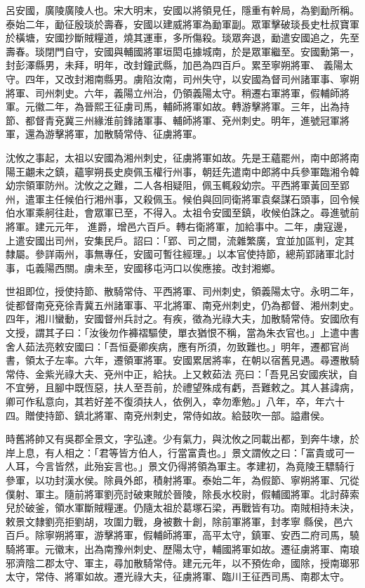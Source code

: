 
\begin{pinyinscope}

 呂安國，廣陵廣陵人也。宋大明末，安國以將領見任，隱重有幹局，為劉勔所稱。泰始二年，勔征殷琰於壽春，安國以建威將軍為勔軍副。眾軍擊破琰長史杜叔寶軍於橫塘，安國抄斷賊糧道，燒其運車，多所傷殺。琰眾奔退，勔遣安國追之，先至壽春。琰閉門自守，安國與輔國將軍垣閎屯據城南，於是眾軍繼至。安國勳第一，封彭澤縣男，未拜，明年，改封鐘武縣，加邑為四百戶。累至寧朔將軍、
 義陽太守。四年，又改封湘南縣男。虜陷汝南，司州失守，以安國為督司州諸軍事、寧朔將軍、司州刺史。六年，義陽立州治，仍領義陽太守。稍遷右軍將軍，假輔師將軍。元徽二年，為晉熙王征虜司馬，輔師將軍如故。轉游擊將軍。三年，出為持節、都督青兗冀三州緣淮前鋒諸軍事、輔師將軍、兗州刺史。明年，進號冠軍將軍，還為游擊將軍，加散騎常侍、征虜將軍。



 沈攸之事起，太祖以安國為湘州刺史，征虜將軍如故。先是王蘊罷州，南中郎將南陽王翽未之鎮，蘊寧朔長史庾佩玉權行州事，朝廷先遣南中郎將中兵參軍臨湘令韓幼宗領軍防州。沈攸之之難，二人各相疑阻，佩玉輒殺幼宗。平西將軍黃回至郢州，遣軍主任候伯行湘州事，又殺佩玉。候伯與回同衛將軍袁粲謀石頭事，回令候伯水軍乘舸往赴，會眾軍已至，不得入。太祖令安國至鎮，收候伯誅之。尋進號前將軍。建元元年，
 進爵，增邑六百戶。轉右衛將軍，加給事中。二年，虜寇邊，上遣安國出司州，安集民戶。詔曰：「郢、司之間，流雜繁廣，宜並加區判，定其隸屬。參詳兩州，事無專任，安國可暫往經理。」以本官使持節，總荊郢諸軍北討事，屯義陽西關。虜未至，安國移屯沔口以俟應接。改封湘鄉。



 世祖即位，授使持節、散騎常侍、平西將軍、司州刺史，領義陽太守。永明二年，徙都督南兗兗徐青冀五州諸軍事、平北將軍、南兗州刺史，仍為都督、湘州刺史。四年，湘川蠻動，安國督州兵討之。有疾，徵為光祿大夫，加散騎常侍。安國欣有文授，謂其子曰：「汝後勿作褲褶驅使，單衣猶恨不稱，當為朱衣官也。」上遣中書舍人茹法亮敕安國曰：「吾恒憂卿疾病，應有所須，勿致難也。」明年，遷都官尚書，領太子左率。六年，遷領軍將軍。安國累居將率，在朝以宿舊見遇。尋遷散騎常侍、金紫光祿大夫、兗州中正，給扶。上又敕茹法
 亮曰：「吾見呂安國疾狀，自不宜勞，且腳中既恆惡，扶人至吾前，於禮望殊成有虧，吾難敕之。其人甚諱病，卿可作私意向，其若好差不復須扶人，依例入，幸勿牽勉。」八年，卒，年六十四。贈使持節、鎮北將軍、南兗州刺史，常侍如故。給鼓吹一部。謚肅侯。



 時舊將帥又有吳郡全景文，字弘達。少有氣力，與沈攸之同載出都，到奔牛埭，於岸上息，有人相之：「君等皆方伯人，行當富貴也。」景文謂攸之曰：「富貴或可一人耳，今言皆然，此殆妄言也。」景文仍得將領為軍主。孝建初，為竟陵王驃騎行參軍，以功封漢水侯。除員外郎，積射將軍。泰始二年，為假節、寧朔將軍、冗從僕射、軍主。隨前將軍劉亮討破東賊於晉陵，除長水校尉，假輔國將軍。北討薛索兒於破釜，領水軍斷賊糧運。仍隨太祖於葛塚石梁，再戰皆有功。南賊相持未決，敕景文隸劉亮拒劉胡，攻圍力戰，身被數十創，除前軍將軍，封孝寧
 縣侯，邑六百戶。除寧朔將軍，游擊將軍，假輔師將軍，高平太守，鎮軍、安西二府司馬，驍騎將軍。元徽末，出為南豫州刺史、歷陽太守，輔國將軍如故。遷征虜將軍、南琅邪濟陰二郡太守、軍主，尋加散騎常侍。建元元年，以不預佐命，國除，授南瑯邪太守，常侍、將軍如故。遷光祿大夫，征虜將軍、臨川王征西司馬、南郡太守。




\end{pinyinscope}
